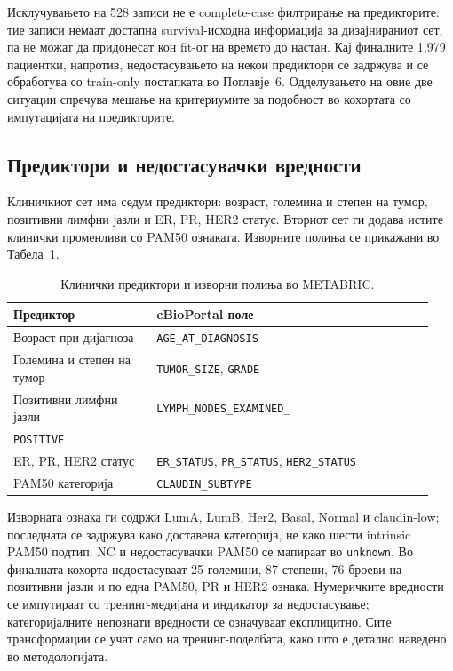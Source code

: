 \documentclass[12pt]{article}
\begin{document}
Исклучувањето на 528 записи не е complete-case филтрирање на предикторите:
тие записи немаат достапна survival-исходна информација за дизајнираниот сет,
па не можат да придонесат кон fit-от на времето до настан. Кај финалните 1,979
пациентки, напротив, недостасувањето на некои предиктори се задржува и се
обработува со train-only постапката во Поглавје~6. Одделувањето на овие две
ситуации спречува мешање на критериумите за подобност во кохортата со импутацијата
на предикторите.

\subsection{Предиктори и недостасувачки вредности}

Клиничкиот сет има седум предиктори: возраст, големина и степен на тумор,
позитивни лимфни јазли и ER, PR, HER2 статус. Вториот сет ги додава истите
клинички променливи со PAM50 ознаката. Изворните полиња се прикажани во
Табела~\ref{tab:metabric-predictors}.

\begin{table}[ht]
\centering
\caption{Клинички предиктори и изворни полиња во METABRIC.}
\label{tab:metabric-predictors}
\small
\begin{tabular}{p{0.32\linewidth}p{0.62\linewidth}}
\hline
Предиктор & cBioPortal поле \\
\hline
Возраст при дијагноза & \texttt{AGE\_AT\_DIAGNOSIS} \\
Големина и степен на тумор & \texttt{TUMOR\_SIZE}, \texttt{GRADE} \\
Позитивни лимфни јазли & \texttt{LYMPH\_NODES\_EXAMINED\_}\\\texttt{POSITIVE} \\
ER, PR, HER2 статус & \texttt{ER\_STATUS}, \texttt{PR\_STATUS}, \texttt{HER2\_STATUS} \\
PAM50 категорија & \texttt{CLAUDIN\_SUBTYPE} \\
\hline
\end{tabular}
\end{table}

Изворната ознака ги содржи LumA, LumB, Her2, Basal, Normal и claudin-low;
последната се задржува како доставена категорија, не како шести intrinsic
PAM50 подтип. NC и недостасувачки PAM50 се мапираат во \texttt{unknown}.
Во финалната кохорта недостасуваат 25 големини, 87 степени, 76 броеви на
позитивни јазли и по една PAM50, PR и HER2 ознака. Нумеричките вредности се
импутираат со тренинг-медијана и индикатор за недостасување; категоријалните
непознати вредности се означуваат експлицитно. Сите трансформации се учат само
на тренинг-поделбата, како што е детално наведено во методологијата.
\end{document}
